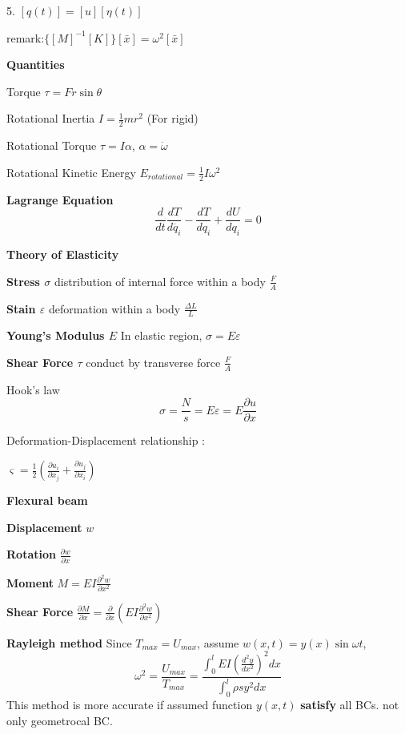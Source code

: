 \documentclass{article}
\begin{document}
\begin{multicols*}{3}
5. $[q(t)]=[u][\eta(t)]$

remark:$\{[M]^{-1}[K]\}[\bar{x}]=\omega^{2}[\bar{x}]$


\noindent\textbf{Quantities}

   Torque $\tau = Fr \sin\theta$

  Rotational Inertia $I=\frac{1}{2}mr^2$ (For rigid)

  Rotational Torque $\tau = I\alpha$, $\alpha = \dot{\omega}$

  Rotational Kinetic Energy $E_{rotational}=\frac{1}{2}I\omega^2$


  \noindent\textbf{Lagrange Equation}
  \begin{equation*}
    \frac{d}{dt}\frac{dT}{d\dot{q_i}} - \frac{dT}{dq_i} + \frac{dU}{dq_i} = 0
  \end{equation*}

  \noindent\textbf{Theory of Elasticity}

\textbf{Stress $\sigma$} distribution of internal force within a body $\frac{F}{A}$

\textbf{Stain $\varepsilon$} deformation within a body $\frac{\Delta L}{L}$

 \textbf{Young's Modulus $E$} In elastic region, $\sigma = E\varepsilon$

\textbf{Shear Force $\tau$} conduct by transverse force $\frac{F}{A}$

  Hook's law
  \begin{equation*}
    \sigma=\frac{N}{s}=E\varepsilon=E\frac{\partial u}{\partial x}
  \end{equation*}

  Deformation-Displacement relationship :

  $\varsigma=\frac{1}{2}(\frac{\partial u_{i}}{\partial x_{j}}+\frac{\partial u_{j}}{\partial x_{i}})$
  
  \textbf{Flexural beam}

  \textbf{Displacement} $w$

  \textbf{Rotation} $\frac{\partial w}{\partial x}$

  \textbf{Moment} $M=EI\frac{\partial^{2} w}{\partial x^{2}}$

  \textbf{Shear Force} $\frac{\partial M}{\partial x}=\frac{\partial }{\partial x}(EI \frac{\partial^{2}w}{\partial x^{2}})$


 
  \noindent\textbf{Rayleigh method} Since $T_{max} = U_{max}$, assume $w(x,t) = y(x) \sin\omega t$,
      \begin{equation*}
        \omega^2 =\frac{U_{max}}{T_{max}}=\frac{\int_0^l EI(\frac{d^2y}{dx^2})^2 dx}{\int_0^l \rho s y^2 dx}
      \end{equation*}
      This method is more accurate if assumed function $y(x,t)$ \textbf{satisfy} all BCs. not only geometrocal BC.


\end{multicols*}
\end{document}
